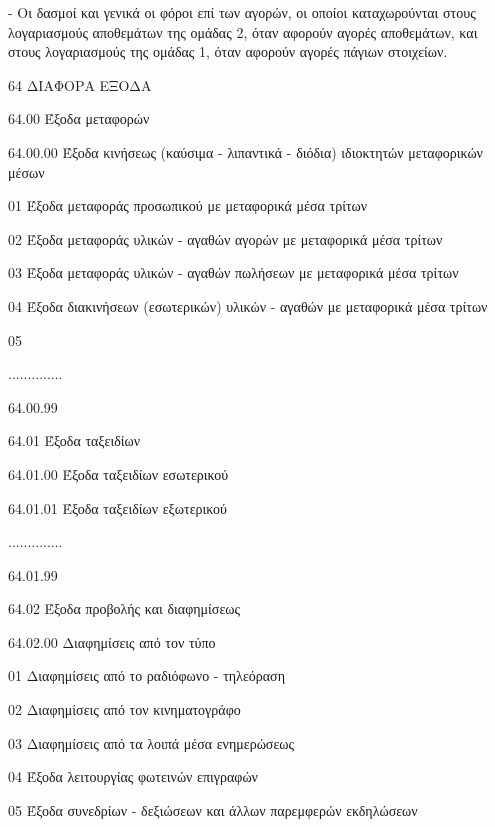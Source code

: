 \documentclass[A4,10pt,greek]{book}
\begin{document}
- Οι δασμοί και γενικά οι φόροι επί των αγορών, οι οποίοι καταχωρούνται στους λογαριασμούς αποθεμάτων της ομάδας 2, όταν αφορούν αγορές αποθεμάτων, και στους λογαριασμούς της ομάδας 1, όταν αφορούν αγορές πάγιων στοιχείων.

64   ΔΙΑΦΟΡΑ ΕΞΟΔΑ

        64.00   Έξοδα μεταφορών

                       64.00.00   Έξοδα κινήσεως (καύσιμα - λιπαντικά - διόδια) ιδιοκτητών
                                         μεταφορικών μέσων

                                 01     Έξοδα μεταφοράς προσωπικού με μεταφορικά μέσα τρίτων

                                 02   Έξοδα μεταφοράς υλικών - αγαθών αγορών με μεταφορικά
                                         μέσα τρίτων

                                 03   Έξοδα μεταφοράς υλικών - αγαθών πωλήσεων με μεταφορικά
                                 μέσα τρίτων

                                 04   Έξοδα διακινήσεων (εσωτερικών) υλικών - αγαθών με
                                 μεταφορικά μέσα τρίτων

                                 05

                       ..............

                       64.00.99

        64.01   Έξοδα ταξειδίων

                       64.01.00   Έξοδα ταξειδίων εσωτερικού

                       64.01.01   Έξοδα ταξειδίων εξωτερικού

                       ..............

                       64.01.99

        64.02   Έξοδα προβολής και διαφημίσεως

                       64.02.00   Διαφημίσεις από τον τύπο

                                 01   Διαφημίσεις από το ραδιόφωνο - τηλεόραση

                                 02   Διαφημίσεις από τον κινηματογράφο

                                 03   Διαφημίσεις από τα λοιπά μέσα ενημερώσεως

                                 04   Έξοδα λειτουργίας φωτεινών επιγραφών

                                 05   Έξοδα συνεδρίων - δεξιώσεων και άλλων παρεμφερών
                                         εκδηλώσεων
\end{document}
